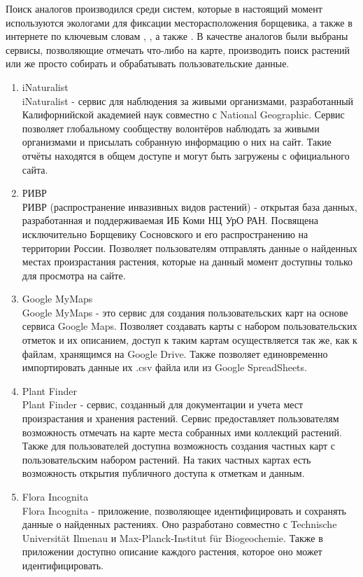 \nwln
Поиск аналогов производился среди систем, которые в настоящий момент используются экологами для фиксации месторасположения борщевика, а также в интернете по ключевым словам , , а также .
В качестве аналогов были выбраны сервисы, позволяющие отмечать что-либо на карте, производить поиск растений или же просто собирать и обрабатывать пользовательские данные.

\begin{enumerate}[topsep=0pt, parsep=0pt, itemsep=0pt, wide=0.5cm]
	\item iNaturalist \\
	iNaturalist\cite{inaturalist} - сервис для наблюдения за живыми организмами, разработанный Калифорнийской академией наук совместно с National Geographic.
	Сервис позволяет глобальному сообществу волонтёров наблюдать за живыми организмами и присылать собранную информацию о них на сайт.
	Такие отчёты находятся в общем доступе и могут быть загружены с официального сайта.
	\item РИВР \\
	РИВР\cite{rivr} (распространение инвазивных видов растений) - открытая база данных, разработанная и поддерживаемая ИБ Коми НЦ УрО РАН.
	Посвящена исключительно Борщевику Сосновского и его распространению на территории России.
	Позволяет пользователям отправлять данные о найденных местах произрастания растения, которые на данный момент доступны только для просмотра на сайте.
	\item Google MyMaps \\
	Google MyMaps\cite{googlemymaps} - это сервис для создания пользовательских карт на основе сервиса Google Maps.
	Позволяет создавать карты с набором пользовательских отметок и их описанием, доступ к таким картам осуществляется так же, как к файлам, хранящимся на Google Drive.
	Также позволяет единовременно импортировать данные их .csv файла или из Google SpreadSheets.
	\item Plant Finder \\
	Plant Finder\cite{plantfinder} - сервис, созданный для документации и
	учета мест произрастания и хранения растений. Сервис
	предоставляет пользователям возможность отмечать на
	карте места собранных ими коллекций растений. Также
	для пользователей доступна возможность создания
	частных карт с пользовательским набором растений. На
	таких частных картах есть возможность открытия
	публичного доступа к отметкам и данным.
	\item Flora Incognita \\
	Flora Incognita\cite{floraincognita} - приложение, позволяющее
	идентифицировать и сохранять данные о найденных
	растениях. Оно разработано совместно с Technische
	Universität Ilmenau и Max-Planck-Institut für Biogeochemie.
	Также в приложении доступно описание каждого
	растения, которое оно может идентифицировать.
\end{enumerate}

